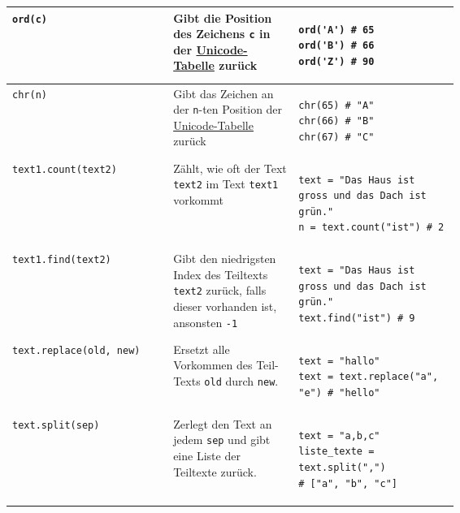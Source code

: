 \begin{table}[H]
\begin{longtable}{lm{0.28\linewidth}m{0.36\linewidth}}
        \lstinline|ord(c)|                 & Gibt die Position des Zeichens \lstinline|c| in der \href{https://en.wikipedia.org/wiki/List_of_Unicode_characters}{Unicode-Tabelle} zurück    & \begin{lstlisting}[numbers=none]
ord('A') # 65
ord('B') # 66
ord('Z') # 90
\end{lstlisting}                                   \\\midrule
        \lstinline|chr(n)|                 & Gibt das Zeichen an der \lstinline|n|-ten Position der \href{https://en.wikipedia.org/wiki/List_of_Unicode_characters}{Unicode-Tabelle} zurück & \begin{lstlisting}[numbers=none]
chr(65) # "A"
chr(66) # "B"
chr(67) # "C"
\end{lstlisting}                                   \\\midrule
        \lstinline|text1.count(text2)|     & Zählt, wie oft der Text \lstinline|text2| im Text \lstinline|text1| vorkommt                                                                   & \begin{lstlisting}[numbers=none]
text = "Das Haus ist gross und das Dach ist grün."
n = text.count("ist") # 2
\end{lstlisting}                                   \\\midrule
        \lstinline|text1.find(text2)|      & Gibt den niedrigsten Index des Teiltexts \lstinline|text2| zurück, falls dieser vorhanden ist, ansonsten \lstinline|-1|                        &\begin{lstlisting}[numbers=none]
text = "Das Haus ist gross und das Dach ist grün."
text.find("ist") # 9
\end{lstlisting}\\\midrule
        \lstinline|text.replace(old, new)| & Ersetzt alle Vorkommen des Teil-Texts \lstinline|old| durch \lstinline|new|.                                                                   & \begin{lstlisting}[numbers=none]
text = "hallo"
text = text.replace("a", "e") # "hello"
\end{lstlisting}                                   \\\midrule
        \lstinline|text.split(sep)|        & Zerlegt den Text an jedem \texttt{sep} und gibt eine Liste der Teiltexte zurück.                                                               & \begin{lstlisting}[numbers=none]
text = "a,b,c"
liste_texte = text.split(",")
# ["a", "b", "c"]

\end{lstlisting}
\end{longtable}
\end{table}

